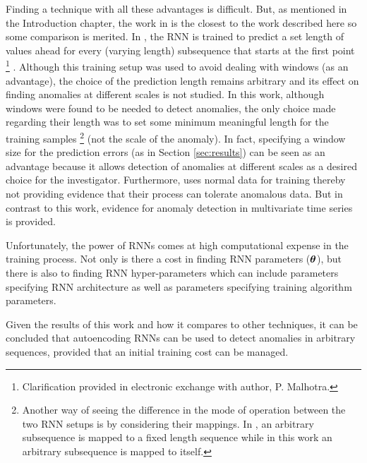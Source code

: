 Finding a technique with all these advantages is difficult.
%
But, as mentioned in the Introduction chapter, the work in \cite{Malhotra2015} is the closest to the work described here so some comparison is merited.
%
In \cite{Malhotra2015}, the RNN is trained to predict a set length of values ahead for every (varying length) subsequence that starts at the first point%
\footnote{Clarification provided in electronic exchange with author, P. Malhotra.}%
.
%
Although this training setup was used to avoid dealing with windows (as an advantage), the choice of the prediction length remains arbitrary and its effect on finding anomalies at different scales is not studied.
%
In this work, although windows were found to be needed to detect anomalies, the only choice made regarding their length was to set some minimum meaningful length for the training samples%
\footnote{Another way of seeing the difference in the mode of operation between the two RNN setups is by considering their mappings. In \cite{Malhotra2015}, an arbitrary subsequence is mapped to a fixed length sequence while in this work an arbitrary subsequence is mapped to itself.}
(not the scale of the anomaly).
%
In fact, specifying a window size for the prediction errors (as in Section \ref{sec:results}) can be seen as an advantage because it allows detection of anomalies at different scales as a desired choice for the investigator.
%
Furthermore, \cite{Malhotra2015} uses normal data for training thereby not providing evidence that their process can tolerate anomalous data.
%
But in contrast to this work, evidence for anomaly detection in multivariate time series is provided.

Unfortunately, the power of RNNs comes at high computational expense in the training process.
%
Not only is there a cost in finding RNN parameters ($\boldsymbol{\theta}$), but there is also to finding RNN hyper-parameters which can include parameters specifying RNN architecture as well as parameters specifying training algorithm parameters.


Given the results of this work and how it compares to other techniques, it can be concluded that autoencoding RNNs can be used to detect anomalies in arbitrary sequences, provided that an initial training cost can be managed.



